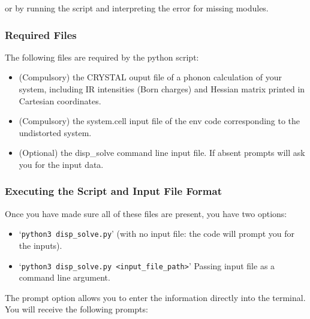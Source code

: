 or by running the script and interpreting the error for missing modules.

\subsubsection{Required Files}
The following files are required by the python script:
\begin{itemize}  
  \item (Compulsory) the CRYSTAL ouput file of a phonon calculation of your system, including IR intensities (Born charges) and Hessian matrix printed in Cartesian coordinates.
  \item (Compulsory) the system.cell input file of the env code corresponding to the undistorted system.
  \item (Optional) the disp\_solve command line input file. If absent prompts will ask you for the input data.  
\end{itemize}

\subsubsection{Executing the Script and Input File Format}
Once you have made sure all of these files are present, you have two options: 
\begin{itemize}
	\item `\texttt{python3 disp\_solve.py}' (with no input file: the code will prompt you for the inputs).
	\item `\texttt{python3 disp\_solve.py <input\_file\_path>}' Passing input file as a command line argument.
\end{itemize}

The prompt option allows you to enter the information directly into the terminal. You will receive the following prompts:

